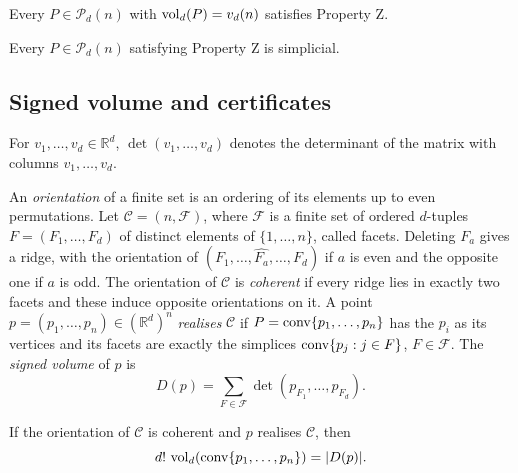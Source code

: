 \begin{remark}
  \label{rem:propertyz}
  Every $P \in \mathcal{P}_{d}(n)$ with $\operatorname{vol}_{d}(P) = v_{d}(n)$ satisfies
  Property Z.
\end{remark}

\begin{lemma}
  \label{lem:simplicial}
  Every $P \in \mathcal{P}_{d}(n)$ satisfying Property Z is simplicial.
\end{lemma}

\subsection{Signed volume and certificates}

For $v_{1}, \ldots, v_{d} \in \mathbb{R}^{d}$, $\det(v_{1}, \ldots, v_{d})$
denotes the determinant of the matrix with columns $v_{1}, \ldots, v_{d}$.

\begin{definition}
  \label{def:signed-volume}
  An \emph{orientation} of a finite set is an ordering of its elements up to
  even permutations. Let $\mathcal{C} = (n, \mathcal{F})$, where
  $\mathcal{F}$ is a finite set of ordered $d$-tuples
  $F = (F_{1}, \ldots, F_{d})$ of distinct elements of $\{1, \ldots, n\}$,
  called facets. Deleting $F_{a}$ gives a ridge, with the orientation of
  $(F_{1}, \ldots, \widehat{F_{a}}, \ldots, F_{d})$ if $a$ is even and the
  opposite one if $a$ is odd. The orientation of $\mathcal{C}$ is
  \emph{coherent} if every ridge lies in exactly two facets and these induce
  opposite orientations on it. A point
  $p = (p_{1}, \ldots, p_{n}) \in (\mathbb{R}^{d})^{n}$ \emph{realises}
  $\mathcal{C}$ if $P = \operatorname{conv}\{p_{1}, \ldots, p_{n}\}$ has the $p_{i}$ as its
  vertices and its facets are exactly the simplices
  $\operatorname{conv}\{p_{j} : j \in F\}$, $F \in \mathcal{F}$. The \emph{signed volume}
  of $p$ is
  \begin{equation}
    \label{eq:signed-volume}
    D(p) = \sum_{F \in \mathcal{F}} \det(p_{F_{1}}, \ldots, p_{F_{d}}).
  \end{equation}
\end{definition}

\begin{lemma}
  \label{lem:volume}
  If the orientation of $\mathcal{C}$ is coherent and $p$ realises
  $\mathcal{C}$, then
  \[
    d!\,\operatorname{vol}_{d}(\operatorname{conv}\{p_{1}, \ldots, p_{n}\}) = |D(p)|.
  \]
\end{lemma}


